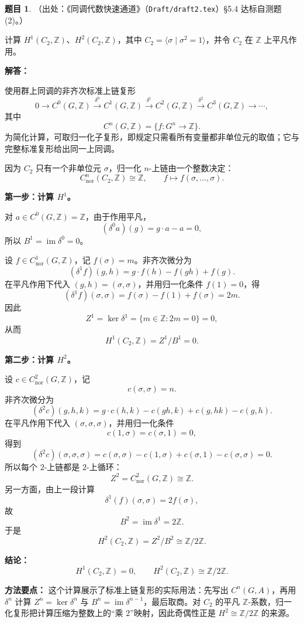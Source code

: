\documentclass[a4paper]{ctexart}
\theoremstyle{definition}
\newtheorem{example}{题目}[section]
\theoremstyle{analysis}
\theoremstyle{plain}
\begin{document}
\begin{example}
（出处：《同调代数快速通道》（\texttt{Draft/draft2.tex}）\S5.4 达标自测题 (2)。）

计算 \(H^1(C_2,\mathbb Z)\)、\(H^2(C_2,\mathbb Z)\)，其中 \(C_2=\langle\sigma\mid\sigma^2=1\rangle\)，并令 \(C_2\) 在 \(\mathbb Z\) 上平凡作用。

\textbf{解答：}

使用群上同调的非齐次标准上链复形
\[
  0\longrightarrow C^0(G,\mathbb Z)
  \xrightarrow{\delta^0}C^1(G,\mathbb Z)
  \xrightarrow{\delta^1}C^2(G,\mathbb Z)
  \xrightarrow{\delta^2}C^3(G,\mathbb Z)\longrightarrow\cdots,
\]
其中
\[
  C^n(G,\mathbb Z)=\{f:G^n\to \mathbb Z\}.
\]
为简化计算，可取归一化子复形，即规定只需看所有变量都非单位元的取值；它与完整标准复形给出同一上同调。

因为 \(C_2\) 只有一个非单位元 \(\sigma\)，归一化 \(n\)-上链由一个整数决定：
\[
  C^n_{\mathrm{nor}}(C_2,\mathbb Z)\cong \mathbb Z,\qquad
  f\longmapsto f(\sigma,\dots,\sigma).
\]

\textbf{第一步：计算 \(H^1\)。}

对 \(a\in C^0(G,\mathbb Z)=\mathbb Z\)，由于作用平凡，
\[
  (\delta^0a)(g)=g\cdot a-a=0,
\]
所以 \(B^1=\operatorname{im}\delta^0=0\)。

设 \(f\in C^1_{\mathrm{nor}}(G,\mathbb Z)\)，记 \(f(\sigma)=m\)。非齐次微分为
\[
  (\delta^1f)(g,h)=g\cdot f(h)-f(gh)+f(g).
\]
在平凡作用下代入 \((g,h)=(\sigma,\sigma)\)，并用归一化条件 \(f(1)=0\)，得
\[
  (\delta^1f)(\sigma,\sigma)
  =
  f(\sigma)-f(1)+f(\sigma)
  =
  2m.
\]
因此
\[
  Z^1=\ker\delta^1=\{m\in\mathbb Z:2m=0\}=0,
\]
从而
\[
  H^1(C_2,\mathbb Z)=Z^1/B^1=0.
\]

\textbf{第二步：计算 \(H^2\)。}

设 \(c\in C^2_{\mathrm{nor}}(G,\mathbb Z)\)，记
\[
  c(\sigma,\sigma)=n.
\]
非齐次微分为
\[
  (\delta^2c)(g,h,k)
  =
  g\cdot c(h,k)-c(gh,k)+c(g,hk)-c(g,h).
\]
在平凡作用下代入 \((\sigma,\sigma,\sigma)\)，并用归一化条件
\[
  c(1,\sigma)=c(\sigma,1)=0,
\]
得到
\[
  (\delta^2c)(\sigma,\sigma,\sigma)
  =
  c(\sigma,\sigma)-c(1,\sigma)+c(\sigma,1)-c(\sigma,\sigma)
  =
  0.
\]
所以每个 \(2\)-上链都是 \(2\)-上循环：
\[
  Z^2=C^2_{\mathrm{nor}}(G,\mathbb Z)\cong\mathbb Z.
\]
另一方面，由上一段计算
\[
  \delta^1(f)(\sigma,\sigma)=2f(\sigma),
\]
故
\[
  B^2=\operatorname{im}\delta^1=2\mathbb Z.
\]
于是
\[
  H^2(C_2,\mathbb Z)=Z^2/B^2\cong \mathbb Z/2\mathbb Z.
\]

\textbf{结论：}
\[
  H^1(C_2,\mathbb Z)=0,\qquad
  H^2(C_2,\mathbb Z)\cong\mathbb Z/2\mathbb Z.
\]

\textbf{方法要点：}
这个计算展示了标准上链复形的实际用法：先写出 \(C^n(G,A)\)，再用 \(\delta^n\) 计算 \(Z^n=\ker\delta^n\) 与 \(B^n=\operatorname{im}\delta^{n-1}\)，最后取商。对 \(C_2\) 的平凡 \(\mathbb Z\)-系数，归一化复形把计算压缩为整数上的“乘 \(2\)”映射，因此奇偶性正是 \(H^2\cong\mathbb Z/2\mathbb Z\) 的来源。
\end{example}
\end{document}
